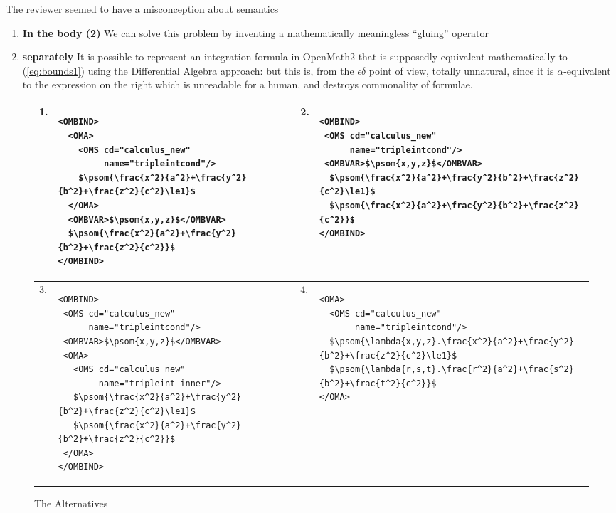\documentclass{llncs}
\begin{document}
\begin{newpart}{The reviewer seemed to have a misconception about semantics}
\begin{enumerate}
\item{\textbf{In the body (2)}}\label{OM:wrapped} We can solve this problem by inventing a
  mathematically meaningless ``gluing'' operator
\item{\textbf{separately}}\label{OM:sep} It is possible to represent an integration
  formula in OpenMath2 that is supposedly equivalent mathematically to (\ref{eq:bounds1})
  using the Differential Algebra approach: but this is, from the $\epsilon\delta$ point of
  view, totally unnatural, since it is $\alpha$-equivalent to the expression on the right
  which is unreadable for a human, and destroys commonality of formulae.
\end{enumerate}

\begin{figure}\centering\vspace*{-.8cm}
\lstset{mathescape,numbers=none,frame=none,aboveskip=-.7em,belowskip=-1.2em}
  \begin{tabular}{|l|p{5.2cm}||l|p{5.2cm}|}\hline
    1.&
\begin{lstlisting}
<OMBIND>
  <OMA>
    <OMS cd="calculus_new" 
         name="tripleintcond"/>
    $\psom{\frac{x^2}{a^2}+\frac{y^2}{b^2}+\frac{z^2}{c^2}\le1}$
  </OMA>
  <OMBVAR>$\psom{x,y,z}$</OMBVAR>
  $\psom{\frac{x^2}{a^2}+\frac{y^2}{b^2}+\frac{z^2}{c^2}}$
</OMBIND>
\end{lstlisting}
& 2. & 
\begin{lstlisting}
<OMBIND>
 <OMS cd="calculus_new" 
      name="tripleintcond"/>
 <OMBVAR>$\psom{x,y,z}$</OMBVAR>
  $\psom{\frac{x^2}{a^2}+\frac{y^2}{b^2}+\frac{z^2}{c^2}\le1}$
  $\psom{\frac{x^2}{a^2}+\frac{y^2}{b^2}+\frac{z^2}{c^2}}$
</OMBIND>
\end{lstlisting}
\\\hline
3. & 
\begin{lstlisting}
<OMBIND>
 <OMS cd="calculus_new" 
      name="tripleintcond"/>
 <OMBVAR>$\psom{x,y,z}$</OMBVAR>
 <OMA>
   <OMS cd="calculus_new" 
        name="tripleint_inner"/>
   $\psom{\frac{x^2}{a^2}+\frac{y^2}{b^2}+\frac{z^2}{c^2}\le1}$
   $\psom{\frac{x^2}{a^2}+\frac{y^2}{b^2}+\frac{z^2}{c^2}}$
 </OMA>
</OMBIND>
\end{lstlisting}
& 4. & 
\begin{lstlisting}
<OMA>
  <OMS cd="calculus_new" 
       name="tripleintcond"/>
  $\psom{\lambda{x,y,z}.\frac{x^2}{a^2}+\frac{y^2}{b^2}+\frac{z^2}{c^2}\le1}$
  $\psom{\lambda{r,s,t}.\frac{r^2}{a^2}+\frac{s^2}{b^2}+\frac{t^2}{c^2}}$
</OMA>
\end{lstlisting}
\\\hline
\end{tabular}
\caption{The Alternatives}\label{fig:alternatives}\vspace*{-2em}
\end{figure}


\end{newpart}
\end{document}
